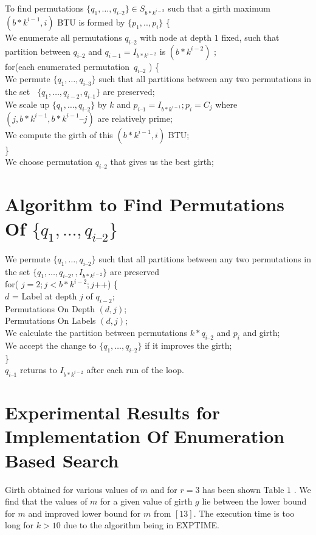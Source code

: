 \documentclass{llncs}
\begin{document}
To find permutations $\{q_{1},{\dots},q_{i\text{--}2}\}\in S_{b\ast k^{i-2}}$ such that a girth maximum  $(b\ast k^{i-1},i)$ BTU is formed by  $\{p_{1},..,p_{i}\}$ \{  \\
We enumerate all permutations  $q_{i\text{--}2}$ with node at depth $1$ fixed,
such that partition between  $q_{i\text{--}2}$  and 
$q_{i - 1} = I_{b \ast k^{i-2}} $ is $(b\ast k^{i-2})$ ; \\
for(each enumerated permutation\  $q_{i\text{--}2}$ ) \{ \\
We permute $\{q_{1},{\dots},q_{i\text{--}3}\}$ such that all partitions between any two permutations in the set \  $\{q_{1},{\dots},q_{i-2},q_{i\text{--}1}\}$ are preserved;  \\
We scale up $\{q_{1},{\dots},q_{i\text{--}2}\}$ by  $k$ and  $p_{i\text{--}1}=I_{b\ast k^{i-1}};p_{i}=C_{j}$ where  $(j,b\ast k^{i-1},b\ast k^{i-1}\text{--}j)$ are relatively prime; \\
We compute the girth of this $(b\ast k^{i-1},i)$ BTU; \\
\} \\
We choose permutation $q_{i\text{--}2}$ that gives us the best girth;

\section {Algorithm to Find Permutations Of $\{q_{1},{\dots},q_{i\text{--}2}\}$}
We permute  $\{q_{1},{\dots},q_{i\text{--}2}\}$ such that all partitions between any two permutations in the set  $\{q_{1},{\dots},q_{i\text{--}2},,I_{b\ast k^{i-2}}\}$ are preserved \\
for( $j=2;j<b\ast k^{i-2};j$++) \{  \\
 $d$ = Label at depth  $j$ of  $q_{i-2}$; \\
Permutations On Depth $(d,j)$; \\
Permutations On Labels $(d,j)$; \\
We calculate the partition between permutations  $k\ast q_{i\text{--}2}$ and  $p_{i}$ and girth; \\
We accept the change to  $\{q_{1},{\dots},q_{i\text{--}2}\}$  if it improves the girth; \\
\} \\
 $q_{i\text{--}1}$ returns to  $I_{b\ast k^{i-2}}$ after each run of the loop.

\section {Experimental Results for Implementation Of Enumeration Based Search}
Girth obtained for various values of  $m$ and  for $r = 3$  has been shown Table $1$ . We find that the values of $m$ for a given value of girth $g$ lie between the lower bound for $m$ and improved lower bound for $m$ from $[13]$. The execution time is too long for $k >10$ due to the algorithm being in EXPTIME.
\end{document}
